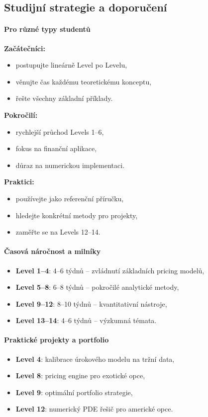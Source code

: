 \spc

\subsection{Studijní strategie a doporučení}
\label{sec:studijni-strategie}

\paragraph{Pro různé typy studentů}
\textbf{Začátečníci:}
\begin{itemize}
  \item postupujte lineárně Level po Levelu,
  \item věnujte čas každému teoretickému konceptu,
  \item řešte všechny základní příklady.
\end{itemize}
\textbf{Pokročilí:}
\begin{itemize}
  \item rychlejší průchod Levels 1--6,
  \item fokus na finanční aplikace,
  \item důraz na numerickou implementaci.
\end{itemize}
\textbf{Praktici:}
\begin{itemize}
  \item používejte jako referenční příručku,
  \item hledejte konkrétní metody pro projekty,
  \item zaměřte se na Levels 12--14.
\end{itemize}

\paragraph{Časová náročnost a milníky}
\begin{itemize}
  \item \textbf{Level 1--4}: 4--6 týdnů -- zvládnutí základních pricing modelů,
  \item \textbf{Level 5--8}: 6--8 týdnů -- pokročilé analytické metody,
  \item \textbf{Level 9--12}: 8--10 týdnů -- kvantitativní nástroje,
  \item \textbf{Level 13--14}: 4--6 týdnů -- výzkumná témata.
\end{itemize}

\paragraph{Praktické projekty a portfolio}
\begin{itemize}
  \item \textbf{Level 4}: kalibrace úrokového modelu na tržní data,
  \item \textbf{Level 8}: pricing engine pro exotické opce,
  \item \textbf{Level 9}: optimální portfolio strategie,
  \item \textbf{Level 12}: numerický PDE řešič pro americké opce.
\end{itemize}

